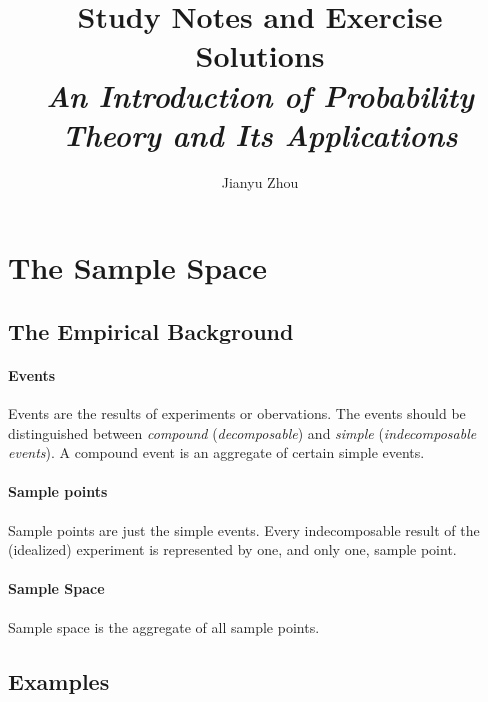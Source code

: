 \documentclass{article}
\author{Jianyu Zhou}
\title{\textbf{Study Notes and Exercise Solutions}\\ \textit{An Introduction of Probability Theory and Its Applications}}
\numberwithin{equation}{subsection}
\begin{document}
	\maketitle
	\tableofcontents
	\newpage
	\section{The Sample Space}
		\subsection{The Empirical Background}
			\paragraph{Events} Events are the results of experiments or obervations. The events should be distinguished between \textit{compound} (\textit{decomposable}) and \textit{simple} (\textit{indecomposable events}). A compound event is an aggregate of certain simple events.
			\paragraph{Sample points} Sample points are just the simple events. Every indecomposable result of the (idealized) experiment is represented by one, and only one, sample point.
			\paragraph{Sample Space} Sample space is the aggregate of all sample points.
		\subsection{Examples}
\end{document}
